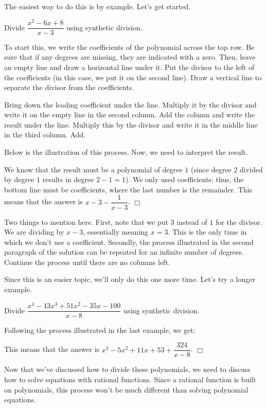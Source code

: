\documentclass[../book.tex]{subfiles}
\begin{document}
The easiest way to do this is by example.  Let's get started.
\begin{example}
Divide $\dfrac{x^2-6x+8}{x-3}$ using synthetic division.
\end{example}
\begin{solution}
To start this, we write the coefficients of the polynomial across the top row.  Be sure that if any degrees are missing, they are indicated with a zero. Then, leave an empty line and draw a horizontal line under it.  Put the divisor to the left of the coefficients (in this case, we put it on the second line).  Draw a vertical line to separate the divisor from the coefficients.

Bring down the leading coefficient under the line.  Multiply it by the divisor and write it on the empty line in the second column.  Add the column and write the result under the line.  Multiply this by the divisor and write it in the middle line in the third column.  Add.

Below is the illustration of this process.  Now, we need to interpret the result.


We know that the result must be a polynomial of degree $1$ (since degree $2$ divided by degree $1$ results in degree $2-1=1$).  We only used coefficients; thus, the bottom line must be coefficients, where the last number is the remainder.  This means that the answer is $x-3-\dfrac{1}{x-3}$. $\Box$
\end{solution}
\begin{remark}
Two things to mention here.  First, note that we put $3$ instead of $1$ for the divisor.  We are dividing by $x-3$, essentially meaning $x=3$.  This is the only time in which we don't use a coefficient.  Secondly, the process illustrated in the second paragraph of the solution can be repeated for an infinite number of degrees.  Continue the process until there are no columns left.
\end{remark}
Since this is an easier topic, we'll only do this one more time.  Let's try a longer example.
\begin{example}
Divide $\dfrac{x^4-13x^3+51x^2-35x-100}{x-8}$ using synthetic division.
\end{example}
\begin{solution}
Following the process illustrated in the last example, we get:


This means that the answer is $x^3-5x^2+11x+53+\dfrac{324}{x-8}$. $\Box$
\end{solution}
\noindent Now that we've discussed how to divide these polynomials, we need to discuss how to solve equations with rational functions.  Since a rational function is built on polynomials, this process won't be much different than solving polynomial equations.
\end{document}
